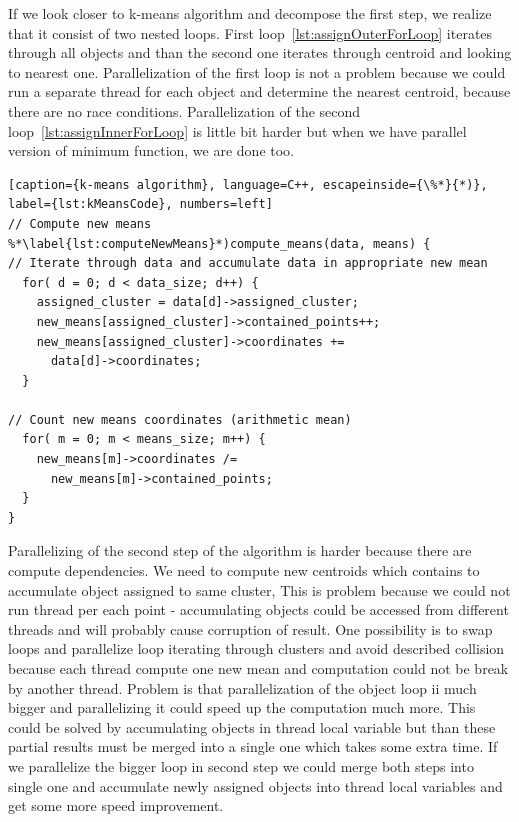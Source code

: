 If we look closer to k-means algorithm and decompose the first step, we realize that it consist of two nested  loops. First loop~\autoref{lst:assignOuterForLoop} iterates through all objects and than the second one iterates through centroid and looking to nearest one. Parallelization of the first loop is not a problem because we could run a separate thread for each object and determine the nearest centroid, because there are no race conditions. Parallelization of the second loop~\autoref{lst:assignInnerForLoop} is little bit harder but when we have parallel version of minimum function, we are done too.\\

\begin{Code}
    \centering
\begin{lstlisting}[caption={k-means algorithm}, language=C++, escapeinside={\%*}{*)}, label={lst:kMeansCode}, numbers=left]
// Compute new means
%*\label{lst:computeNewMeans}*)compute_means(data, means) {
// Iterate through data and accumulate data in appropriate new mean
  for( d = 0; d < data_size; d++) {
    assigned_cluster = data[d]->assigned_cluster;
    new_means[assigned_cluster]->contained_points++;
    new_means[assigned_cluster]->coordinates +=
      data[d]->coordinates;
  }
  
// Count new means coordinates (arithmetic mean)
  for( m = 0; m < means_size; m++) {
    new_means[m]->coordinates /=
      new_means[m]->contained_points;
  }
}
\end{lstlisting}
    \caption{Code for second step - computing new means}
\end{Code}
Parallelizing of the second step of the algorithm is harder because there are compute dependencies. We need to compute new centroids which contains to accumulate object assigned to same cluster, This is problem because we could not run thread per each point - accumulating objects could be accessed from different threads and will probably cause corruption of result.
One possibility is to swap loops and parallelize loop iterating through clusters and avoid described collision because each thread compute one new mean and computation could not be break by another thread. Problem is that parallelization of the object loop ii much bigger and parallelizing it could speed up the computation much more. This could be solved by accumulating objects in thread local variable but than these partial results must be merged into a single one which takes some extra time.
If we parallelize the bigger loop in second step we could merge both steps into single one and accumulate newly assigned objects into thread local variables and get some more speed improvement.